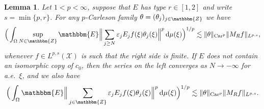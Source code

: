 \documentclass[a4paper,10pt]{amsart}
\theoremstyle{plain}
\newtheorem{lemma}{Lemma}
\theoremstyle{definition}
\theoremstyle{remark}
\begin{document}
\begin{lemma}
\label{mainlemma}
  Let $1 < p < \infty$, suppose that $E$ has type $r\in [1,2]$ and write $s = \min \{ p,r \}$.
  For any $p$-Carleson family $\theta = (\theta_j )_{j\in{\mathbbm{Z}}}$ we have
  \begin{equation*}
    \Big( \int_{\Omega} \sup_{N\in{\mathbbm{Z}}}{\mathbbm{E}} \Big\| \sum_{j\geq N} \varepsilon_j E_jf(\xi ) \theta_j(\xi ) \Big\|^p {\,\text{d}}\mu (\xi ) \Big)^{1/p}
    \lesssim \| \theta \|_{\textup{Car}^p} \| M_R f \|_{L^{p,s}} ,
  \end{equation*}
whenever $f\in L^{p,s}(\mathcal{X})$ is such that the right side is finite. If $E$ does not contain an isomorphic copy of $c_0$, then the series on the left converges as $N\to-\infty$ for a.e.~$\xi$, and we also have
\begin{equation*}
    \Big( \int_{\Omega} {\mathbbm{E}} \Big\| \sum_{j\in{\mathbbm{Z}}} \varepsilon_j E_jf(\xi ) \theta_j(\xi ) \Big\|^p {\,\text{d}}\mu (\xi ) \Big)^{1/p}
    \lesssim \| \theta \|_{\textup{Car}^p} \| M_R f \|_{L^{p,s}}.
    \end{equation*}  
\end{lemma}
  
\end{document}
